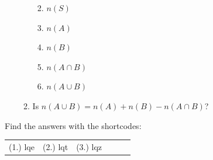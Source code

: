 \begin{enumerate}[noitemsep, label=\textbf{\arabic*}. ]
\begin{enumerate}[noitemsep, label=\textbf{\alph*}. ]
\begin{enumerate}[noitemsep, label=\textbf{\roman*}. ]
            \label{m39377*uid30}\item \begin{math}n\left(S\right)\end{math}\label{m39377*uid31}\item \begin{math}n\left(A\right)\end{math}\label{m39377*uid32}\item \begin{math}n\left(B\right)\end{math}\label{m39377*uid33}\item \begin{math}n\left(A\cap B\right)\end{math}\label{m39377*uid34}\item \begin{math}n\left(A\cup B\right)\end{math}\end{enumerate}
        \label{m39377*uid35}\item Is \begin{math}n\left(A\cup B\right)=n\left(A\right)+n\left(B\right)-n\left(A\cap B\right)\end{math}?
\end{enumerate}
                \end{enumerate}
        
          




  \label{m39377**end}
          
\par {} Find the answers with the shortcodes:
 \par \begin{tabular}[h]{cccccc}
 (1.) lqe  &  (2.) lqt  &  (3.) lqz  & \end{tabular}



%     
%     
%     
%     
%     
    
